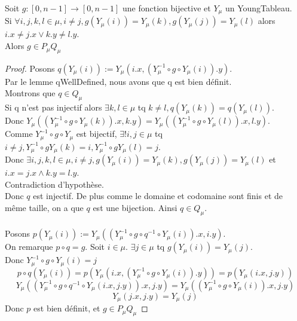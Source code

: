 \begin{lemma}[No2FromSameColToSameRow]
    \label{No2FromSameColToSameRow}
    Soit $g : [0,n-1] \to [0,n-1]$ une fonction bijective et $Y_{\mu}$ un YoungTableau.\\
    Si $\forall i, j, k, l \in \mu, i \neq j, g(Y_{\mu}(i)) = Y_{\mu}(k), g(Y_{\mu}(j)) = Y_{\mu}(l)$ alors $i.x \neq j.x \lor k.y \neq l.y$.\\
    Alors $g \in P_{\mu}Q_{\mu}$
\end{lemma}
\begin{proof}
    Posons $q(Y_{\mu}(i)) := Y_{\mu}(i.x,(Y_{\mu}^{-1} \circ g \circ Y_{\mu}(i)).y)$.\\
    Par le lemme qWellDefined, nous avons que q est bien définit.\\
    Montrons que $q \in Q_{\mu}$\\
    Si q n'est pas injectif alors $\exists k, l \in \mu$ tq $k \neq l, q(Y_{\mu}(k))=q(Y_{\mu}(l))$.\\
    Donc $Y_{\mu}((Y_{\mu}^{-1} \circ g \circ Y_{\mu}(k)).x,k.y) = Y_{\mu}((Y_{\mu}^{-1} \circ g \circ Y_{\mu}(l)).x,l.y)$.\\
    Comme $Y_{\mu}^{-1} \circ g \circ Y_{\mu}$ est bijectif, $\exists! i,j \in \mu$ tq $i \neq j, Y_{\mu}^{-1} \circ g Y_{\mu}(k)=i, Y_{\mu}^{-1} \circ g Y_{\mu}(l)=j$.\\
    Donc $\exists i, j, k, l \in \mu, i \neq j, g(Y_{\mu}(i)) = Y_{\mu}(k), g(Y_{\mu}(j)) = Y_{\mu}(l)$ et $i.x = j.x \land k.y = l.y$.\\
    Contradiction d'hypothèse.\\
    Donc $q$ est injectif. De plus comme le domaine et codomaine sont finis et de même taille, on a que $q$ est une bijection. Ainsi $q \in Q_{\mu}$.\\
    \\
    Posons $p(Y_{\mu}(i)) := Y_{\mu}((Y_{\mu}^{-1} \circ g \circ q^{-1} \circ Y_{\mu}(i)).x,i.y)$.\\
    On remarque $p \circ q = g$. Soit $i \in \mu$. $\exists j \in \mu$ tq $g(Y_{\mu}(i))=Y_{\mu}(j)$.\\
    Donc $Y_{\mu}^{-1} \circ g \circ Y_{\mu}(i) = j$
    \[ p \circ q(Y_{\mu}(i)) = p (Y_{\mu}(i.x,(Y_{\mu}^{-1} \circ g \circ Y_{\mu}(i)).y)) = p (Y_{\mu}(i.x,j.y)) \]
    \[Y_{\mu}((Y_{\mu}^{-1} \circ g \circ q^{-1} \circ Y_{\mu}(i.x,j.y)).x,j.y) = Y_{\mu}((Y_{\mu}^{-1} \circ g \circ Y_{\mu}(i)).x,j.y)\]
    \[ Y_{\mu}(j.x,j.y) = Y_{\mu}(j)\]
    Donc $p$ est bien définit, et $g \in P_{\mu} Q_{\mu}$
\end{proof}
